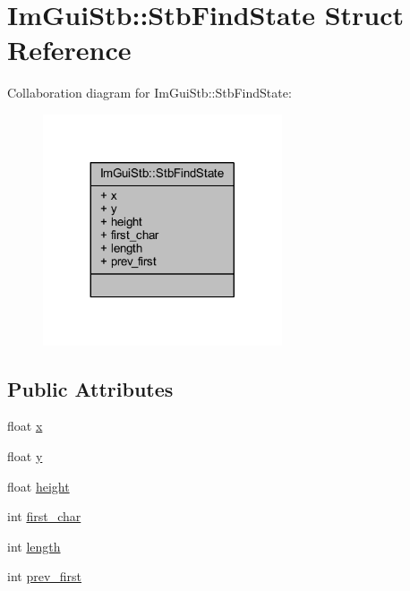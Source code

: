 \hypertarget{struct_im_gui_stb_1_1_stb_find_state}{}\section{Im\+Gui\+Stb\+:\+:Stb\+Find\+State Struct Reference}
\label{struct_im_gui_stb_1_1_stb_find_state}


Collaboration diagram for Im\+Gui\+Stb\+:\+:Stb\+Find\+State\+:
\nopagebreak
\begin{figure}[H]
\begin{center}
\leavevmode
\includegraphics[width=200pt]{struct_im_gui_stb_1_1_stb_find_state__coll__graph}
\end{center}
\end{figure}
\subsection*{Public Attributes}
\begin{DoxyCompactItemize}
\item 
float \mbox{\hyperlink{struct_im_gui_stb_1_1_stb_find_state_a391de227ff11c00c2726988aed6fe5d6}{x}}
\item 
float \mbox{\hyperlink{struct_im_gui_stb_1_1_stb_find_state_a16d674ba203b37cecd265f02bc679449}{y}}
\item 
float \mbox{\hyperlink{struct_im_gui_stb_1_1_stb_find_state_a4bdad2788ba8c8785c8961e14e2529ac}{height}}
\item 
int \mbox{\hyperlink{struct_im_gui_stb_1_1_stb_find_state_a6ad39fc199ae5e89b565a6abf35fefd7}{first\+\_\+char}}
\item 
int \mbox{\hyperlink{struct_im_gui_stb_1_1_stb_find_state_a255b330cee989cac3fea58afd6f08c3d}{length}}
\item 
int \mbox{\hyperlink{struct_im_gui_stb_1_1_stb_find_state_ab0dbf2d67355b0454427a5c811c5174f}{prev\+\_\+first}}
\end{DoxyCompactItemize}


